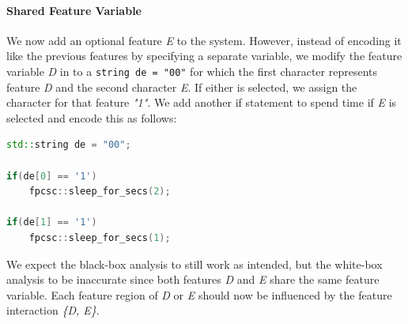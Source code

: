 \paragraph{Shared Feature Variable}\label{ground-truth:Shared}
We now add an optional feature \emph{E} to the system. 
However, instead of encoding it like the previous features by specifying a separate variable, 
we modify the feature variable \emph{D} in  to a \texttt{string de = "00"} 
for which the first character represents feature \emph{D} and the second character \emph{E}. If either is selected, 
we assign the character for that feature \emph{"1"}. We add another if statement to spend time if \emph{E} is selected and encode this as follows:

\begin{minipage}{\linewidth}
\begin{lstlisting}[language=C++,label={lst:shared},escapechar=|]
std::string de = "00";

if(de[0] == '1')
    fpcsc::sleep_for_secs(2);

if(de[1] == '1')
    fpcsc::sleep_for_secs(1);
\end{lstlisting}
\end{minipage}

We expect the black-box analysis to still work as intended, but the white-box analysis to be inaccurate since both features \emph{D} and \emph{E} share the same feature variable. 
Each feature region of \emph{D} or \emph{E} should now be influenced by the feature interaction \emph{\{D, E\}}.